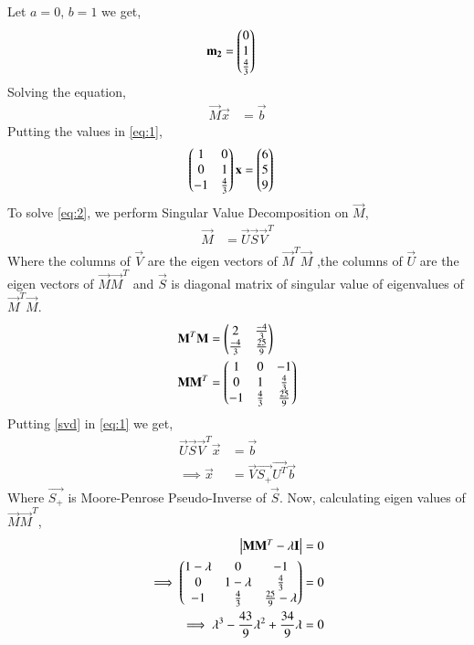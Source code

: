 \documentclass[journal,12pt,twocolumn]{IEEEtran}
\begin{document}
Let $a=0$, $b=1$ we get, 
\begin{align}
    \mathbf{m_2}&=\begin{pmatrix}0\\1\\\frac{4}{3}\end{pmatrix}
\end{align}
Solving the equation, 
\begin{align} \label{eq:1}
    \vec{M}\vec{x}&=\vec{b}
\end{align}
Putting the values in \eqref{eq:1}, 
\begin{align} \label{eq:2}
    \begin{pmatrix}1&0\\0&1\\-1&\frac{4}{3}\end{pmatrix}\mathbf{x}&= \begin{pmatrix}6\\5\\9\end{pmatrix}
\end{align}
To solve \eqref{eq:2}, we perform Singular Value Decomposition on $\vec{M}$, 
\begin{align} \label{svd}
    \vec{M}&=\vec{U}\vec{S}\vec{V}^T
\end{align}
Where the columns of $\vec{V}$ are the eigen vectors of $\vec{M}^T\vec{M}$ ,the columns of $\vec{U}$ are the eigen vectors of $\vec{M}\vec{M}^T$ and $\vec{S}$ is diagonal matrix of singular value of eigenvalues of $\vec{M}^T\vec{M}$.
\begin{align}
    \mathbf{M}^T\mathbf{M}&=\begin{pmatrix}2&\frac{-4}{3}\\ \frac{-4}{3}& \frac{25}{9}\end{pmatrix} \label{MTM}\\
    \mathbf{M}\mathbf{M}^T&=\begin{pmatrix}1&0&-1\\0&1&\frac{4}{3}\\-1&\frac{4}{3}&\frac{25}{9}\end{pmatrix} \label{MMT}
\end{align}
Putting \eqref{svd} in \eqref{eq:1} we get, 
\begin{align}
    \vec{U}\vec{S}\vec{V}^T\vec{x}&= \vec{b}\\
    \implies\vec{x} &= \vec{V}\vec{S_+}\vec{U^T}\vec{b}\label{eq:X}
\end{align}
Where $\vec{S_+}$ is Moore-Penrose Pseudo-Inverse of $\vec{S}$. Now, calculating eigen values of $\vec{M}\vec{M}^T$,
\begin{align}
\begin{vmatrix}\mathbf{M}\mathbf{M}^T - \lambda\mathbf{I}\end{vmatrix} &= 0\\
\implies\begin{pmatrix}1-\lambda&0&-1\\0&1-\lambda&\frac{4}{3}\\-1&\frac{4}{3}&\frac{25}{9}-\lambda\end{pmatrix} &=0\\
\implies\lambda^3-\frac{43}{9}\lambda^2+\frac{34}{9}\lambda &=0
\end{align}
\end{document}
